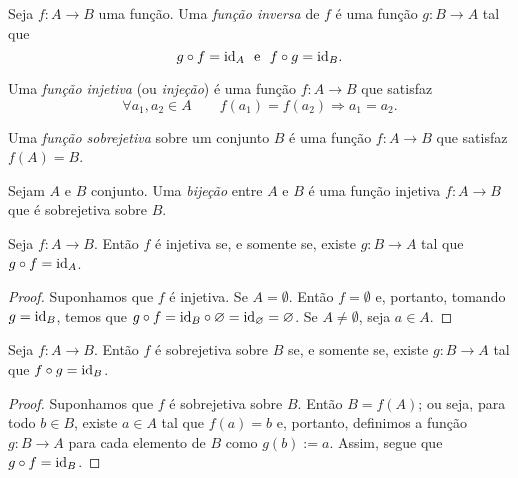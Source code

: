 \begin{defi}
	Seja $f: A \to B$ uma função. Uma \emph{função inversa} de $f$ é uma função $g: B \to A$ tal que
	\begin{equation*}
	g \circ f = \mathrm{id}_A \text{\ \ e\ \ } f \circ g = \mathrm{id}_B.
	\end{equation*}
\end{defi}

\begin{defi}
	Uma \emph{função injetiva} (ou \emph{injeção}) é uma função $f: A \to B$ que satisfaz
	\begin{equation*}
	\forall a_1,a_2 \in A \qquad f(a_1)=f(a_2) \Rightarrow a_1=a_2.
	\end{equation*}
\end{defi}

\begin{defi}
	Uma \emph{função sobrejetiva} sobre um conjunto $B$ é uma função $f: A \to B$ que satisfaz $f(A)=B$.
\end{defi}

\begin{defi}
	Sejam $A$ e $B$ conjunto. Uma \emph{bijeção} entre $A$ e $B$ é uma função injetiva $f: A \to B$ que é sobrejetiva sobre $B$.
\end{defi}

\begin{prop}
\label{prop:func.inv.esq}
	Seja $f: A \to B$. Então $f$ é injetiva se, e somente se, existe $g: B \to A$ tal que $g \circ f = \mathrm{id}_A$.
\end{prop}
\begin{proof}
	Suponhamos que $f$ é injetiva. Se $A = \emptyset$. Então $f=\emptyset$ e, portanto, tomando $g=\mathrm{id}_B$, temos que $g \circ f = \mathrm{id}_B \circ \varnothing = \mathrm{id}_\varnothing = \varnothing$.
	Se $A \neq \emptyset$, seja $a \in A$.
	
	
\end{proof}

\begin{prop}
\label{prop:func.inv.dir}
	Seja $f: A \to B$. Então $f$ é sobrejetiva sobre $B$ se, e somente se, existe $g: B \to A$ tal que $f \circ g = \mathrm{id}_B$.
\end{prop}
\begin{proof}
	Suponhamos que $f$ é sobrejetiva sobre $B$. Então $B=f(A)$; ou seja, para todo $b \in B$, existe $a \in A$ tal que $f(a)=b$ e, portanto, definimos a função $g: B \to A$ para cada elemento de $B$ como $g(b) := a$. Assim, segue que $g \circ f = \mathrm{id}_B$.
\end{proof}

